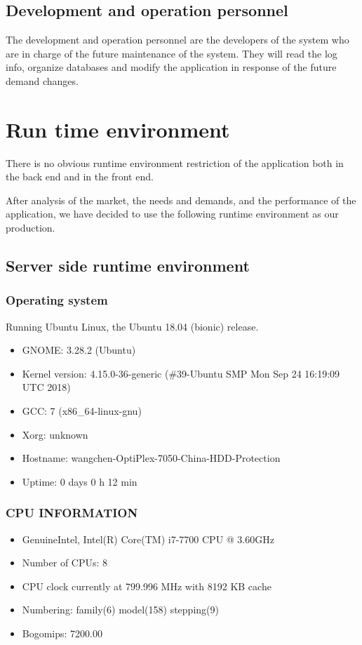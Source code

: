 \documentclass[a4paper]{report}
\begin{document}
\subsection{Development and operation personnel}
The development and operation personnel are the developers of the system who are in charge of the future maintenance of the system. They will read the log info, organize databases and modify the application in response of the future demand changes.
\section{Run time environment}
There is no obvious runtime environment restriction of the application both in the back end and in the front end.
\par
After analysis of the market, the needs and demands, and the performance of the application, we have decided to use the following runtime environment as our production. 
\subsection{Server side runtime environment}
\subsubsection{Operating system}
Running Ubuntu Linux, the Ubuntu 18.04 (bionic) release.
\begin{itemize}
\item GNOME: 3.28.2 (Ubuntu)
\item Kernel version: 4.15.0-36-generic (\#39-Ubuntu SMP Mon Sep 24 16:19:09 UTC 2018)
\item GCC: 7 (x86\_64-linux-gnu)
\item Xorg: unknown
\item Hostname: wangchen-OptiPlex-7050-China-HDD-Protection
\item	Uptime: 0 days 0 h 12 min
\end{itemize}
\subsubsection{CPU INFORMATION}
\begin{itemize}
\item GenuineIntel, Intel(R) Core(TM) i7-7700 CPU @ 3.60GHz
\item Number of CPUs: 8
\item CPU clock currently at 799.996 MHz with 8192 KB cache
\item Numbering: family(6) model(158) stepping(9)
\item	Bogomips: 7200.00
\end{itemize}
\end{document}
